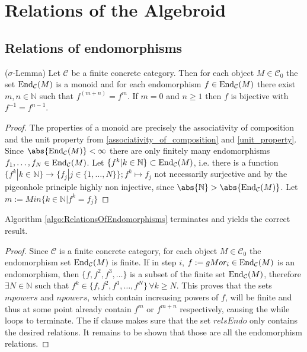 
\section{Relations of the Algebroid}

\subsection{Relations of endomorphisms}


\begin{lemma}{($\sigma$-Lemma)}
Let $\mathcal{C}$ be a finite concrete category. Then for each object $M \in \mathcal{C}_{0}$ the set
$\textup{End}_{\mathcal{C}}(M)$ is a monoid and for each endomorphism $f \in \textup{End}_{\mathcal{C}}(M)$
there exist $m,n \in \mathbb{N}$ such that $f^{(m+n)}=f^{m}$. If $m = 0$ and $n \geq 1$ then $f$ is bijective with $f^{-1} = f^{n-1}$.
\end{lemma}
\begin{proof}
The properties of a monoid are precisely the associativity of composition and the unit property from \ref{associativity_of_composition} and \ref{unit_property}.
Since $\abs{\textup{End}_{\mathcal{C}}(M)}<\infty$ there are only finitely many endomorphisms $f_{1},\dots, f_{N} \in \textup{End}_{\mathcal{C}}(M)$.
Let $\{f^{k} | k \in \mathbb{N} \} \subset \textup{End}_{\mathcal{C}}(M)$, i.e. there is a function 
$\{f^{k} | k \in \mathbb{N}\} \rightarrow \{f_{j} | j \in \{1,\dots,N\}\}; f^{k} \mapsto f_{j}$ not necessarily surjective and 
by the pigeonhole principle highly non injective, since $\abs{\mathbb{N}}>\abs{\textup{End}_{\mathcal{C}}(M)}$.
Let $m := Min \{ k \in \mathbb{N}| f^{k} =  f_{j} \}$
\begin{minipage}{.45\textwidth}\phantom{}\end{minipage}
\end{proof}

\begin{lemma}
Algorithm \ref{algo:RelationsOfEndomorphisms} terminates and yields the correct result.
\begin{proof}
Since $\mathcal{C}$ is a finite concrete category, for each object $M \in \mathcal{C}_{0}$ the endomorphism set
$\textup{End}_{\mathcal{C}}(M)$ is finite. If in step $i$, $f := gMor_{i} \in \textup{End}_{\mathcal{C}}(M)$ is an endomorphism,
then $\{f, f^{2}, f^{3}, \dots\}$ is a subset of the finite set $\textup{End}_{\mathcal{C}}(M)$, therefore $\exists N \in \mathbb{N}$ such that
$f^{k} \in \{f, f^{2}, f^{3}, \dots, f^{N}\} \, \forall k \geq N$.
This proves that the sets $mpowers$ and $npowers$, which contain increasing powers of $f$, will be finite and thus at some point
already contain $f^{m}$ or $f^{m+n}$ respectively, causing the while loops to terminate.
The if clause makes sure that the set $relsEndo$ only contains the desired relations. It remains to be shown that those are all
the endomorphism relations.
\end{proof}
\end{lemma}

